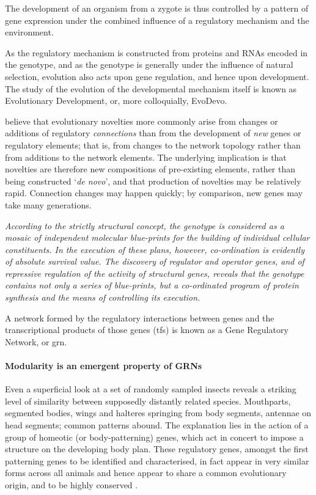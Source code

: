 The development of an organism from a zygote is thus controlled by a pattern of gene expression under the combined influence of a regulatory mechanism and the environment.

As the regulatory mechanism is constructed from proteins and RNAs encoded in the genotype, and as the genotype is generally under the influence of natural selection, evolution also acts upon gene regulation, and hence upon development. The study of the evolution of the developmental mechanism itself is known as Evolutionary Development, or, more colloquially, EvoDevo.

\parencite{Prudhomme:2007ax} believe that evolutionary novelties more commonly arise from changes or additions of regulatory \emph{connections} than from the development of \emph{new} genes or regulatory elements; that is, from changes to the network topology rather than from additions to the network elements. The underlying implication is that novelties are therefore new compositions of
pre-existing elements, rather than being constructed `\emph{de novo}', and that production of novelties may be relatively rapid. Connection changes may happen quickly; by comparison, new genes may take many generations.

\begin{flushright}
	\emph{According to the strictly structural concept, the genotype is considered as a mosaic of independent molecular blue-prints for the building of individual cellular constituents. In the execution of these plans, however, co-ordination is evidently of absolute survival value. The discovery of regulator and operator genes, and of repressive regulation of the activity of structural genes, reveals that the genotype contains not only a series of blue-prints, but a co-ordinated program of protein synthesis and the means of controlling its execution.}
	\par\cite[p354]{Jacob:1961ys}
\end{flushright}

A network formed by the regulatory interactions between genes and the transcriptional products of those genes (\glspl{tf}) is known as a Gene Regulatory Network, or \gls{grn}.

\paragraph{Modularity is an emergent property of GRNs}
Even a superficial look at a set of randomly sampled insects reveals a striking level of similarity between supposedly distantly related species. Mouthparts, segmented bodies, wings and halteres springing from body segments, antennae on head segments; common patterns abound. The explanation lies in the action of a group of homeotic (or body-patterning) genes, which act in concert to impose a structure on the developing body plan. These regulatory genes, amongst the first patterning genes to be identified and characterised, in fact appear in very similar forms across all animals and hence appear to share a common evolutionary origin, and to be highly conserved \parencite{Shubin:2009vw}. 

